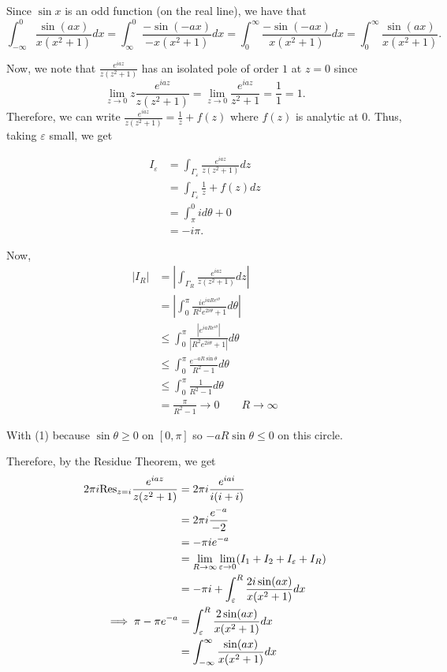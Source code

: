 \documentclass[12pt]{Qual}
\begin{document}
\begin{solution}
Since $\sin x$ is an odd function (on the real line), we have that $$\int_{-\infty}^0\frac{\sin(ax)}{x(x^2+1)}dx=\int_\infty^0\frac{-\sin(-ax)}{-x(x^2+1)}dx=\int_0^\infty\frac{-\sin(-ax)}{x(x^2+1)}dx=\int_0^\infty\frac{\sin(ax)}{x(x^2+1)}.$$

Now, we note that $\frac{e^{iaz}}{z(z^2+1)}$ has an isolated pole of order $1$ at $z=0$ since $$\lim_{z\to0}z\frac{e^{iaz}}{z(z^2+1)}=\lim_{z\to 0}\frac{e^{iaz}}{z^2+1}=\frac{1}{1}=1.$$ Therefore, we can write $\frac{e^{iaz}}{z(z^2+1)}=\frac{1}{z}+f(z)$ where $f(z)$ is analytic at $0$. Thus, taking $\varepsilon$ small, we get

\begin{align*}
    I_\varepsilon&=\int_{\Gamma_\varepsilon}\frac{e^{iaz}}{z(z^2+1)}dz\\
    &=\int_{\Gamma_\varepsilon}\frac{1}{z}+f(z)dz\\
    &=\int_\pi^0id\theta+0\\
    &=-i\pi.
\end{align*}

Now, \begin{align*}
    |I_R|&=\left|\int_{\Gamma_R}\frac{e^{iaz}}{z(z^2+1)}dz\right|\\
    &=\left|\int_0^\pi\frac{ie^{iaRe^{i\theta}}}{R^2e^{2i\theta}+1}d\theta\right|\\
    &\le\int_0^\pi\frac{|e^{iaRe^{i\theta}}|}{|R^2e^{2i\theta}+1|}d\theta\\
    &\le\int_0^\pi\frac{e^{-aR\sin\theta}}{R^2-1}d\theta\\
    &\le\int_0^\pi\frac{1}{R^2-1}d\theta\tag{1}\\
    &=\frac{\pi}{R^2-1}\to0\qquad R\to\infty
\end{align*}

With (1) because $\sin\theta\ge0$ on $[0,\pi]$ so $-aR\sin\theta\le 0$ on this circle.

Therefore, by the Residue Theorem, we get \begin{align*}
    2\pi i\text{Res}_{z=i}\frac{e^{iaz}}{z(z^2+1)}&=2\pi i\frac{e^{iai}}{i(i+i)}\\
    &=2\pi i\frac{e^{-a}}{-2}\\
    &=-\pi ie^{-a}\\
    &=\lim_{R\to\infty}\lim_{\varepsilon\to0}(I_1+I_2+I_\varepsilon+I_R)\\
    &=-\pi i+\int_\varepsilon^R\frac{2i\sin(ax)}{x(x^2+1)}dx\\
    \implies \pi-\pi e^{-a}&=\int_\varepsilon^R\frac{2\sin(ax)}{x(x^2+1)}dx\\
    &=\int_{-\infty}^\infty\frac{\sin(ax)}{x(x^2+1)}dx
\end{align*}

\end{solution}
\newpage
\end{document}
